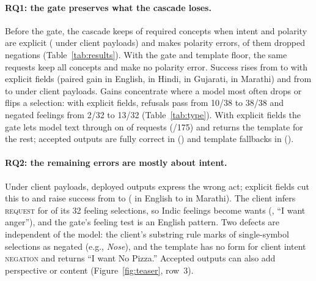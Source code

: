 \paragraph{RQ1: the gate preserves what the cascade loses.}
Before the gate, the cascade keeps \XPreSKeptPct{} of required concepts when intent and polarity are explicit (\XPreUKeptPct{} under client payloads) and makes \XPreSPol{} polarity errors, \XPolDropPreS{} of them dropped negations (Table~\ref{tab:results}).
With the gate and template floor, the same requests keep all \NConc{} concepts and make no polarity error.
Success rises from \XPreSSucc{} to \XDepSSucc{} with explicit fields (paired gain \PSPEN{} in English, \PSPHI{} in Hindi, \PSPGU{} in Gujarati, \PSPMR{} in Marathi) and from \XPreUSucc{} to \XDepUSucc{} under client payloads.
Gains concentrate where a model most often drops or flips a selection: with explicit fields, refusals pass from 10/38 to 38/38 and negated feelings from 2/32 to 13/32 (Table~\ref{tab:type}).
With explicit fields the gate lets model text through on \XGateAccPctS{} of requests (\XGateAccS{}/175) and returns the template for the rest; accepted outputs are fully correct in \XGateOkS{} (\XGateOkPctS{}) and template fallbacks in \XFbOkS{} (\XFbOkPctS{}).

\paragraph{RQ2: the remaining errors are mostly about intent.}
Under client payloads, \XDepUWrong{} deployed outputs express the wrong act; explicit fields cut this to \XDepSWrong{} and raise success from \XDepUSuccPct{} to \XDepSSuccPct{} (\PSUEN{} in English to \PSUMR{} in Marathi).
The client infers \textsc{request} for \UIFeelReq{} of its 32 feeling selections, so Indic feelings become wants (, ``I want anger''), and the gate's feeling test is an English pattern.
Two defects are independent of the model: the client's substring rule marks \UIFalseNeg{} of \UISingle{} single-symbol selections as negated (e.g., \emph{Nose}), and the template has no form for client intent \textsc{negation} and returns ``I want No Pizza.''
Accepted outputs can also add perspective or content (Figure~\ref{fig:teaser}, row~3).

